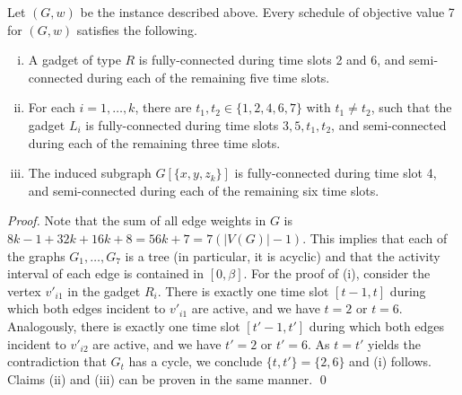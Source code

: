 \documentclass[runningheads]{llncs}
\newcommand{\set}[1]{\{ #1 \}}
\begin{document}
\begin{lemma}
\label{lemma:gadgets_properties}
Let $(G,w)$ be the instance described above. 
Every schedule of objective value 7 for $(G, w)$ satisfies the following.
\begin{enumerate}[(i)]
\item A gadget of type $R$ is fully-connected during time slots 2 and 6, and 
semi-connected during each of the remaining five time slots.
\item For each $i=1,\dots,k$, there are $t_1,t_2 \in \set{1,2,4,6,7}$ with $t_1\ne t_2$, such that the gadget $L_i$ is fully-connected during time slots $3,5,t_1, t_2$, 
and semi-connected during each of the remaining three time slots.
\item The induced subgraph $G[\set{x, y, z_k}]$ is fully-connected during time slot 4, 
and semi-connected during each of the remaining six time slots.
\end{enumerate}
\end{lemma}
\begin{proof}
Note that the sum of all edge weights in $G$ is $8k-1 +32k +16k +8 = 56k+7 = 7(|V(G)|-1)$. 
This implies that each of the graphs $G_1,\ldots,G_7$ is a tree (in particular, it is acyclic) and that the activity interval of each edge is contained in $[0, \beta]$.
For the proof of (i), consider the vertex $v'_{i1}$ in the gadget $R_i$. 
There is exactly one time slot $[t-1, t]$ during which both edges incident to $v'_{i1}$ are active, 
and we have $t=2$ or $t=6$. 
Analogously, there is exactly one time slot $[t'-1, t']$ during which both edges incident to 
$v'_{i2}$ are active, and we have $t' = 2$ or $t' = 6$. 
As $t=t'$ yields the contradiction that $G_t$ has a cycle, we conclude $\set{t,t'}=\set{2,6}$ and (i) follows. 
Claims (ii) and (iii) can be proven in the same manner. 
\qed
\end{proof}
\end{document}

